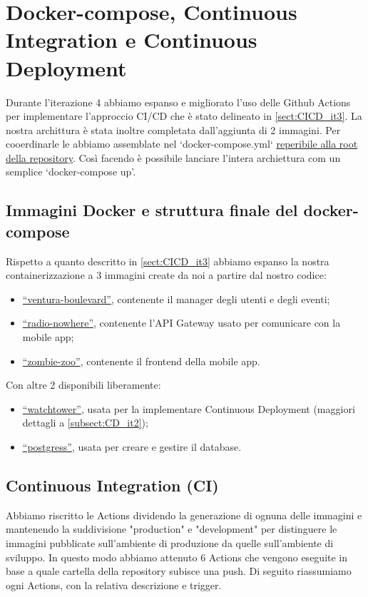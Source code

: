 \section{Docker-compose, Continuous Integration e Continuous Deployment}
Durante l'iterazione 4 abbiamo espanso e migliorato l'uso delle Github Actions per implementare l'approccio CI/CD che è stato delineato in \ref{sect:CICD_it3}.
La nostra archittura è stata inoltre completata dall'aggiunta di 2 immagini. Per cooerdinarle le abbiamo assemblate nel `docker-compose.yml` \href{https://github.com/FI-153/Progetto-PAC-2023-24/blob/main/docker-compose.yml}{reperibile alla root della repository}. Così facendo è possibile lanciare l'intera archiettura com un semplice `docker-compose up'.
\subsection{Immagini Docker e struttura finale del docker-compose}
Rispetto a quanto descritto in \ref{sect:CICD_it3} abbiamo espanso la nostra containerizzazione a 3 immagini create da noi a partire dal nostro codice:
\begin{itemize}
  \item \href{https://hub.docker.com/repository/docker/freddy153/ventura_boulevard/general}{``ventura-boulevard''}, contenente il manager degli utenti e degli eventi;
  \item \href{https://hub.docker.com/repository/docker/freddy153/radio_nowhere/general}{``radio-nowhere''}, contenente l'API Gateway usato per comunicare con la mobile app;
  \item \href{https://hub.docker.com/repository/docker/freddy153/zombie_zoo/general}{``zombie-zoo''}, contenente il frontend della mobile app.
\end{itemize}
Con altre 2 disponibili liberamente:
\begin{itemize}
  \item \href{https://github.com/containrrr/watchtower}{``watchtower''}, usata per la implementare Continuous Deployment (maggiori dettagli a \ref{subsect:CD_it2});
  \item \href{https://hub.docker.com/_/postgres}{``postgress''}, usata per creare e gestire il database.
\end{itemize}
\newpage
\subsection{Continuous Integration (CI)}
Abbiamo riscritto le Actions dividendo la generazione di ognuna delle immagini e mantenendo la suddivisione "production" e "development" per distinguere le immagini pubblicate sull'ambiente di produzione da quelle sull'ambiente di sviluppo. In questo modo abbiamo attenuto 6 Actions che vengono eseguite in base a quale cartella della repository subisce una push. Di seguito riassumiamo ogni Actions, con la relativa descrizione e trigger.
